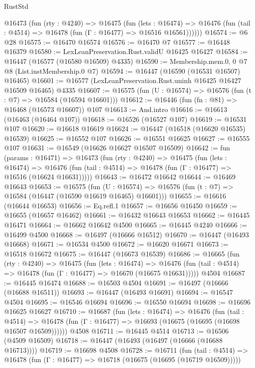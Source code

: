 \begin{lexlean}{RustStd}
\begin{coremodule}
      @16473
        (fun (rty : @4240) =>
        @16475
          (fun (lets : @16474) =>
          @16476 (fun (tail : @4514) => @16478 (fun (Γ : @16477) => @16516 @16561))))))
@16574 := @6 @28
@16575 := @16470 @16574
@16576 := @16470 @7
@16577 := @16448 @16379
@16580 := LexLeanPreservation.Rust.validU @16425 @16427
@16584 := @16447 (@16577 (@16580 @16509) @4335)
@16590 := Membership.mem.{0, 0} @7 @8 (List.instMembership.{0} @7)
@16594 := @16447 (@16590 (@16531 @16507) @16465)
@16601 := @16577 (LexLeanPreservation.Rust.uninh @16425 @16427 @16509 @16465) @4335
@16607 := @16575 (fun (U : @16574) => @16576 (fun (t : @7) => @16584 (@16594 @16601)))
@16612 := @16446 (fun (fn : @81) => @16468 (@16573 @16607)) @107
@16613 := And.intro
@16616 := @16613 (@16463 (@16464 @107))
@16618 := @16526 (@16527 @107)
@16619 := @16531 @107
@16620 := @16618 @16619
@16624 := @16447 (@16518 (@16620 @16535) @16539)
@16625 := @16552 @107
@16626 := @16551 @16625
@16627 := @16555 @107
@16631 := @16549 (@16626 @16627 @16507 @16509)
@16642 := fun (params : @16471) =>
  @16473
    (fun (rty : @4240) =>
    @16475
      (fun (lets : @16474) =>
      @16476 (fun (tail : @4514) => @16478 (fun (Γ : @16477) => @16516 (@16624 @16631)))))
@16643 := @16472 @16642
@16644 := @16469 @16643
@16653 := @16575
    (fun (U : @16574) => @16576 (fun (t : @7) => @16584 (@16447 (@16590 @16619 @16465) @16601)))
@16655 := @16616 (@16644 @16653)
@16656 := Eq.refl.{1}
@16657 := @16656 @16450
@16659 := @16655 (@16657 @16462)
@16661 := @16432 @16643 @16653
@16662 := @16445 @16471
@16664 := @16662 @16642 @4500
@16665 := @16445 @4240
@16666 := @16499 @4500
@16668 := @16497 (@16666 @16512)
@16670 := @16447 (@16493 @16668)
@16671 := @16534 @4500
@16672 := @16620 @16671
@16673 := @16518 @16672
@16675 := @16447 (@16673 @16539)
@16686 := @16665
    (fun (rty : @4240) =>
    @16475
      (fun (lets : @16474) =>
      @16476 (fun (tail : @4514) => @16478 (fun (Γ : @16477) => @16670 (@16675 @16631)))))
    @4504
@16687 := @16445 @16474
@16688 := @16503 @4504
@16691 := @16497 (@16666 (@16688 @16511))
@16693 := @16447 (@16493 @16691)
@16694 := @16547 @4504
@16695 := @16546 @16694
@16696 := @16550 @16694
@16698 := @16696 @16625 @16627
@16710 := @16687
    (fun (lets : @16474) =>
    @16476
      (fun (tail : @4514) =>
      @16478 (fun (Γ : @16477) => @16693 (@16675 (@16695 (@16698 @16507 @16509))))))
    @4508
@16711 := @16445 @4514
@16713 := @16506 (@4509 @16509)
@16718 := @16447 (@16493 (@16497 (@16666 (@16688 @16713))))
@16719 := @16698 @4508
@16728 := @16711
    (fun (tail : @4514) => @16478 (fun (Γ : @16477) => @16718 (@16675 (@16695 (@16719 @16509)))))

\end{coremodule}
\end{lexlean}
